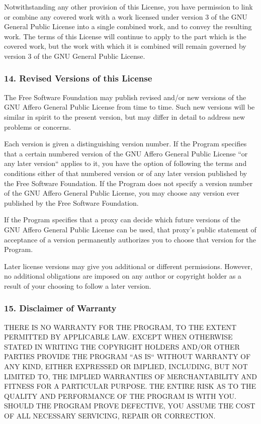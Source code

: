 \documentclass[a4paper, 11pt, twoside]{article}
\begin{document}
Notwithstanding any other provision of this License, you have permission to link or combine any covered work with a work licensed under version 3 of the GNU General Public License into a single combined work, and to convey the resulting work. The terms of this License will continue to apply to the part which is the covered work, but the work with which it is combined will remain governed by version 3 of the GNU General Public License.

\subsubsection{14. Revised Versions of this License}

The Free Software Foundation may publish revised and/or new versions of the GNU Affero General Public License from time to time. Such new versions will be similar in spirit to the present version, but may differ in detail to address new problems or concerns.

Each version is given a distinguishing version number. If the Program specifies that a certain numbered version of the GNU Affero General Public License “or any later version“ applies to it, you have the option of following the terms and conditions either of that numbered version or of any later version published by the Free Software Foundation. If the Program does not specify a version number of the GNU Affero General Public License, you may choose any version ever published by the Free Software Foundation.

If the Program specifies that a proxy can decide which future versions of the GNU Affero General Public License can be used, that proxy's public statement of acceptance of a version permanently authorizes you to choose that version for the Program.

Later license versions may give you additional or different permissions. However, no additional obligations are imposed on any author or copyright holder as a result of your choosing to follow a later version.

\subsubsection{15. Disclaimer of Warranty}

THERE IS NO WARRANTY FOR THE PROGRAM, TO THE EXTENT PERMITTED BY APPLICABLE LAW. EXCEPT WHEN OTHERWISE STATED IN WRITING THE COPYRIGHT HOLDERS AND/OR OTHER PARTIES PROVIDE THE PROGRAM “AS IS“ WITHOUT WARRANTY OF ANY KIND, EITHER EXPRESSED OR IMPLIED, INCLUDING, BUT NOT LIMITED TO, THE IMPLIED WARRANTIES OF MERCHANTABILITY AND FITNESS FOR A PARTICULAR PURPOSE. THE ENTIRE RISK AS TO THE QUALITY AND PERFORMANCE OF THE PROGRAM IS WITH YOU. SHOULD THE PROGRAM PROVE DEFECTIVE, YOU ASSUME THE COST OF ALL NECESSARY SERVICING, REPAIR OR CORRECTION.
\end{document}
